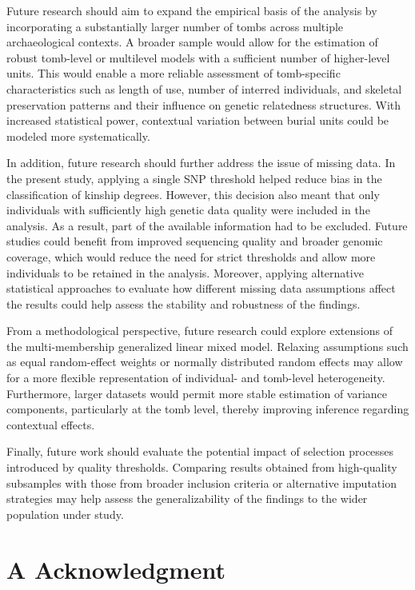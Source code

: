 \documentclass[
]{ajs}
\begin{document}
Future research should aim to expand the empirical basis of the analysis
by incorporating a substantially larger number of tombs across multiple
archaeological contexts. A broader sample would allow for the estimation
of robust tomb-level or multilevel models with a sufficient number of
higher-level units. This would enable a more reliable assessment of
tomb-specific characteristics such as length of use, number of interred
individuals, and skeletal preservation patterns and their influence on
genetic relatedness structures. With increased statistical power,
contextual variation between burial units could be modeled more
systematically.

In addition, future research should further address the issue of missing
data. In the present study, applying a single SNP threshold helped
reduce bias in the classification of kinship degrees. However, this
decision also meant that only individuals with sufficiently high genetic
data quality were included in the analysis. As a result, part of the
available information had to be excluded. Future studies could benefit
from improved sequencing quality and broader genomic coverage, which
would reduce the need for strict thresholds and allow more individuals
to be retained in the analysis. Moreover, applying alternative
statistical approaches to evaluate how different missing data
assumptions affect the results could help assess the stability and
robustness of the findings.

From a methodological perspective, future research could explore
extensions of the multi-membership generalized linear mixed model.
Relaxing assumptions such as equal random-effect weights or normally
distributed random effects may allow for a more flexible representation
of individual- and tomb-level heterogeneity. Furthermore, larger
datasets would permit more stable estimation of variance components,
particularly at the tomb level, thereby improving inference regarding
contextual effects.

Finally, future work should evaluate the potential impact of selection
processes introduced by quality thresholds. Comparing results obtained
from high-quality subsamples with those from broader inclusion criteria
or alternative imputation strategies may help assess the
generalizability of the findings to the wider population under study.

\section{A Acknowledgment}\label{a-acknowledgment}
\end{document}

